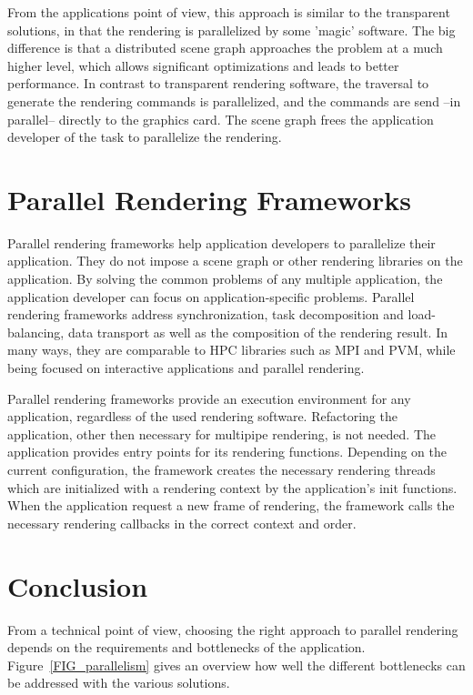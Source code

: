 \documentclass[10pt,a4paper]{scrartcl}
\begin{document}
From the applications point of view, this approach is similar to the
transparent solutions, in that the rendering is parallelized by some
'magic' software. The big difference is that a distributed scene graph
approaches the problem at a much higher level, which allows significant
optimizations and leads to better performance. In contrast to
transparent rendering software, the traversal to generate the rendering
commands is parallelized, and the commands are send --in parallel--
directly to the graphics card. The scene graph frees the application
developer of the task to parallelize the rendering.

\section{Parallel Rendering Frameworks}
Parallel rendering frameworks help application developers to parallelize
their application. They do not impose a scene graph or other rendering
libraries on the application. By solving the common problems of
any multiple application, the application developer can focus on
application-specific problems. Parallel rendering frameworks address
synchronization, task decomposition and load-balancing, data transport
as well as the composition of the rendering result. In many ways, they
are  comparable to HPC libraries such as MPI and PVM, while being
focused on interactive applications and parallel rendering.

Parallel rendering frameworks provide an execution environment for any
application, regardless of the used rendering software. Refactoring the
application, other then necessary for multipipe rendering, is not
needed. The application provides entry points for its rendering
functions. Depending on the current configuration, the framework creates
the necessary rendering threads which are initialized with a rendering
context by the application's init functions. When the application
request a new frame of rendering, the framework calls the necessary
rendering callbacks in the correct context and order.

\section{Conclusion}

From a technical point of view, choosing the right approach to
parallel rendering depends on the requirements and bottlenecks of the
application. Figure~\ref{FIG_parallelism} gives an overview how well the
different bottlenecks can be addressed with the various solutions.
\end{document}
